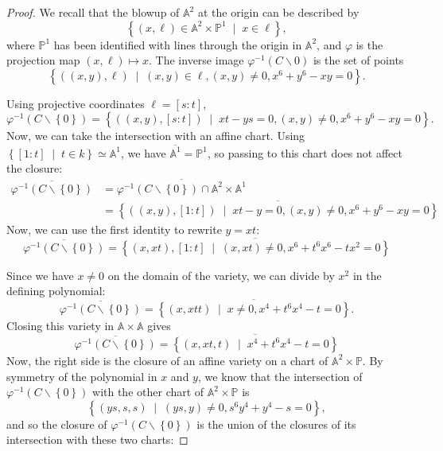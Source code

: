 \documentclass[12pt]{article}
\theoremstyle{definition}
\newenvironment{problem}[2][Problem]{\begin{trivlist}
\item[\hskip \labelsep {\bfseries #1}\hskip \labelsep {\bfseries #2.}]}{\end{trivlist}}
\begin{document}
\begin{problem}{1}
\begin{enumerate}
\begin{proof}
					\par We recall that the blowup of $\mathbb A^2$ at the origin can be described by 
					\[\left\{ (x,\ell) \in \mathbb A^2 \times \mathbb P^1 \;\mid\; x \in \ell \right\},\]
					where $\mathbb P^1$ has been identified with lines through the origin in $\mathbb A^2$, and $\varphi$ is the projection map $(x,\ell )\mapsto x$. The inverse image $\varphi^{-1}(C \backslash 0)$ is the set of points
					\[\left\{ ( (x,y), \ell) \;\mid\; (x,y) \in \ell, (x,y) \neq 0, x^6 + y^6 - xy = 0 \right\}.\]
					\par Using projective coordinates $\ell = [s:t]$,
					\[\varphi^{-1}(C \backslash \left\{ 0 \right\}) = \left\{ ( (x,y), [s:t]) \;\mid\; xt - ys = 0, (x,y) \neq 0, x^6 + y^6 - xy = 0 \right\}.  \]
					Now, we can take the intersection with an affine chart. Using $\left\{ [1:t] \;\mid\; t \in k \right\} \simeq \mathbb A^1$, we have $\overline{\mathbb A^1} = \mathbb P^1$, so passing to this chart does not affect the closure:
					\begin{align*}
						\overline{\varphi^{-1}(C \backslash \left\{ 0 \right\})} &= \overline{ \varphi^{-1}(C \backslash \left\{ 0 \right\}) \cap \mathbb A^2 \times \mathbb A^1}\\
						&= \overline{ \left\{ ( (x,y), [1:t]) \; \mid \; xt - y = 0, (x,y) \neq 0, x^6 + y^6 - xy = 0\right \}}
					\end{align*}
					Now, we can use the first identity to rewrite $y = xt$:
					\[\overline{\varphi^{-1}(C \backslash \left\{ 0 \right\})} = \overline { \left\{ (x, xt), [1:t]\;\mid \; (x,xt) \neq 0, x^6 + t^6x^6 -tx^2 = 0 \right\}}\]
					\par Since we have $x \neq 0$ on the domain of the variety, we can divide by $x^2$ in the defining polynomial:
					\[\overline{\varphi^{-1}(C \backslash \left\{ 0 \right\})} = \overline { \left\{ (x, xt t)\; \mid \; x \neq 0,  x^4 + t^6x^4 - t = 0 \right\}}.\]
					Closing this variety in $\mathbb A \times \mathbb A$ gives
					\[\overline{\varphi^{-1}(C \backslash \left\{ 0 \right\})} = \overline { \left\{ (x, xt, t)\; \mid \;  x^4 + t^6x^4 - t = 0 \right\}}\]
					Now, the right side is the closure of an affine variety on a chart of $\mathbb A^2 \times \mathbb P$. By symmetry of the polynomial in $x$ and $y$, we know that the intersection of ${\varphi^{-1}(C \backslash \left\{ 0 \right\})}$ with the other chart of $\mathbb A^2 \times \mathbb P$ is
					\[ \left\{ (ys, s, s) \;\mid\; (ys, y) \neq 0, s^6y^4 +y^4 - s = 0 \right\},\]
					and so the closure of $\varphi^{-1}(C \backslash \left\{ 0 \right\})$ is the union of the closures of its intersection with these two charts:

\end{proof}
\end{enumerate}
\end{problem}
\end{document}
